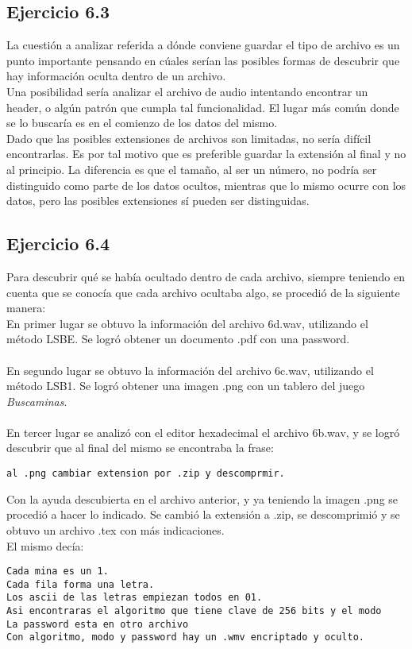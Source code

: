 \documentclass{article}
\begin{document}
\subsection{Ejercicio 6.3}

\noindent La cuestión a analizar referida a dónde conviene guardar el tipo de archivo es un punto importante pensando en cúales serían las posibles formas de descubrir que hay información oculta dentro de un archivo.\\
Una posibilidad sería analizar el archivo de audio intentando encontrar un header, o algún patrón que cumpla tal funcionalidad. El lugar más común donde se lo buscaría es en el comienzo de los datos del mismo.\\
Dado que las posibles extensiones de archivos son limitadas, no sería difícil encontrarlas. Es por tal motivo que es preferible guardar la extensión al final y no al principio. La diferencia es que el tamaño, al ser un número, no podría ser distinguido como parte de los datos ocultos, mientras que lo mismo ocurre con los datos, pero las posibles extensiones sí pueden ser distinguidas.

\subsection{Ejercicio 6.4}

\noindent Para descubrir qué se había ocultado dentro de cada archivo, siempre teniendo en cuenta que se conocía que cada archivo ocultaba algo, se procedió de la siguiente manera:\\

\noindent En primer lugar se obtuvo la información del archivo 6d.wav, utilizando el método LSBE. Se logró obtener un documento .pdf con una password.\\
\\
En segundo lugar se obtuvo la información del archivo 6c.wav, utilizando el método LSB1. Se logró obtener una imagen .png con un tablero del juego \textit{Buscaminas}.\\
\\
En tercer lugar se analizó con el editor hexadecimal el archivo 6b.wav, y se logró descubrir que al final del mismo se encontraba la frase:
\begin{verbatim}
al .png cambiar extension por .zip y descomprmir.
\end{verbatim}

\noindent Con la ayuda descubierta en el archivo anterior, y ya teniendo la imagen .png se procedió a hacer lo indicado. Se cambió la extensión a .zip, se descomprimió y se obtuvo un archivo .tex con más indicaciones.\\
El mismo decía:
\begin{verbatim}
Cada mina es un 1.
Cada fila forma una letra.
Los ascii de las letras empiezan todos en 01.
Asi encontraras el algoritmo que tiene clave de 256 bits y el modo
La password esta en otro archivo
Con algoritmo, modo y password hay un .wmv encriptado y oculto.
\end{verbatim}
\end{document}
